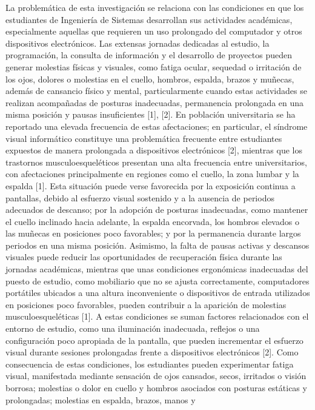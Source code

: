 \documentclass[12pt,letterpaper]{article}
\begin{document}
La problemática de esta investigación se relaciona con las condiciones en que los
estudiantes de Ingeniería de Sistemas desarrollan sus actividades académicas,
especialmente aquellas que requieren un uso prolongado del computador y otros
dispositivos electrónicos. Las extensas jornadas dedicadas al estudio, la
programación, la consulta de información y el desarrollo de proyectos pueden generar
molestias físicas y visuales, como fatiga ocular, sequedad o irritación de los ojos,
dolores o molestias en el cuello, hombros, espalda, brazos y muñecas, además de
cansancio físico y mental, particularmente cuando estas actividades se realizan
acompañadas de posturas inadecuadas, permanencia prolongada en una misma posición y
pausas insuficientes [1], [2]. En población universitaria se ha reportado una elevada
frecuencia de estas afectaciones; en particular, el síndrome visual informático
constituye una problemática frecuente entre estudiantes expuestos de manera
prolongada a dispositivos electrónicos [2], mientras que los trastornos
musculoesqueléticos presentan una alta frecuencia entre universitarios, con
afectaciones principalmente en regiones como el cuello, la zona lumbar y la espalda
[1]. Esta situación puede verse favorecida por la exposición continua a pantallas,
debido al esfuerzo visual sostenido y a la ausencia de periodos adecuados de
descanso; por la adopción de posturas inadecuadas, como mantener el cuello inclinado
hacia adelante, la espalda encorvada, los hombros elevados o las muñecas en
posiciones poco favorables; y por la permanencia durante largos periodos en una
misma posición. Asimismo, la falta de pausas activas y descansos visuales puede
reducir las oportunidades de recuperación física durante las jornadas académicas,
mientras que unas condiciones ergonómicas inadecuadas del puesto de estudio, como
mobiliario que no se ajusta correctamente, computadores portátiles ubicados a una
altura inconveniente o dispositivos de entrada utilizados en posiciones poco
favorables, pueden contribuir a la aparición de molestias musculoesqueléticas [1]. A
estas condiciones se suman factores relacionados con el entorno de estudio, como una
iluminación inadecuada, reflejos o una configuración poco apropiada de la pantalla,
que pueden incrementar el esfuerzo visual durante sesiones prolongadas frente a
dispositivos electrónicos [2]. Como consecuencia de estas condiciones, los
estudiantes pueden experimentar fatiga visual, manifestada mediante sensación de ojos
cansados, secos, irritados o visión borrosa; molestias o dolor en cuello y hombros
asociados con posturas estáticas y prolongadas; molestias en espalda, brazos, manos y
\end{document}
